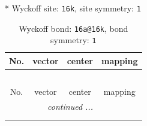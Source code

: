 \documentclass[fleqn,8pt]{jsarticle}
\begin{document}
* Wyckoff site: {\tt 16k}, site symmetry: {\tt 1}
\renewcommand{\arraystretch}{1.2}
\begin{longtable}{cccc}
\caption{Wyckoff bond: {\tt 16a@16k}, bond symmetry: {\tt 1}}
 \\
 \hline \hline
No. & vector & center & mapping \\ \hline \endfirsthead

\multicolumn{3}{l}{\tablename\ \thetable{}} \\
 \hline \hline
No. & vector & center & mapping \\ \hline \endhead

 \hline \hline
\multicolumn{3}{r}{\footnotesize\it continued ...} \\ \endfoot

 \hline \hline
\multicolumn{3}{r}{} \\ \endlastfoot


\end{longtable}
\end{document}
